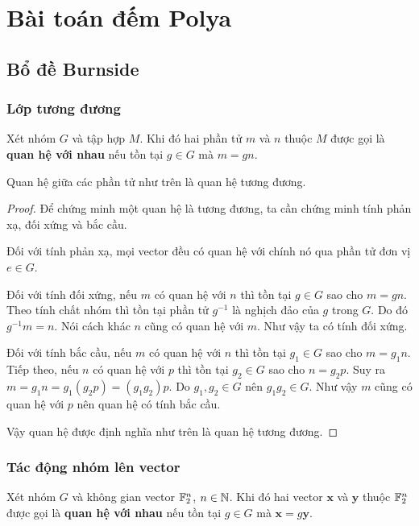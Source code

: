 \chapter{Bài toán đếm Polya}

\section{Bổ đề Burnside}

\subsection*{Lớp tương đương}

Xét nhóm $G$ và tập hợp $M$. Khi đó hai phần tử $m$ và $n$ thuộc $M$ được gọi là \textbf{quan hệ với nhau} nếu tồn tại $g \in G$ mà $m = g n$.

\begin{remark}
    Quan hệ giữa các phần tử như trên là quan hệ tương đương.    
\end{remark}

\begin{proof}
    Để chứng minh một quan hệ là tương đương, ta cần chứng minh tính phản xạ, đối xứng và bắc cầu.

    Đối với tính phản xạ, mọi vector đều có quan hệ với chính nó qua phần tử đơn vị $e \in G$.

    Đối với tính đối xứng, nếu $m$ có quan hệ với $n$ thì tồn tại $g \in G$ sao cho $m = gn$. Theo tính chất nhóm thì tồn tại phần tử $g^{-1}$ là nghịch đảo của $g$ trong $G$. Do đó $g^{-1} m = n$. Nói cách khác $n$ cũng có quan hệ với $m$. Như vậy ta có tính đối xứng.

    Đối với tính bắc cầu, nếu $m$ có quan hệ với $n$ thì tồn tại $g_1 \in G$ sao cho $m = g_1 n$. Tiếp theo, nếu $n$ có quan hệ với $p$ thì tồn tại $g_2 \in G$ sao cho $n = g_2 p$. Suy ra $m = g_1 n = g_1 (g_2 p) = (g_1 g_2) p$. Do $g_1, g_2 \in G$ nên $g_1 g_2 \in G$. Như vậy $m$ cũng có quan hệ với $p$ nên quan hệ có tính bắc cầu.

    Vậy quan hệ được định nghĩa như trên là quan hệ tương đương.
\end{proof}

\subsection*{Tác động nhóm lên vector}

Xét nhóm $G$ và không gian vector $\mathbb{F}_2^n$, $n \in \mathbb{N}$. Khi đó hai vector $\bm{x}$ và $\bm{y}$ thuộc $\mathbb{F}_2^n$ được gọi là \textbf{quan hệ với nhau} nếu tồn tại $g \in G$ mà $\bm{x} = g \bm{y}$.

